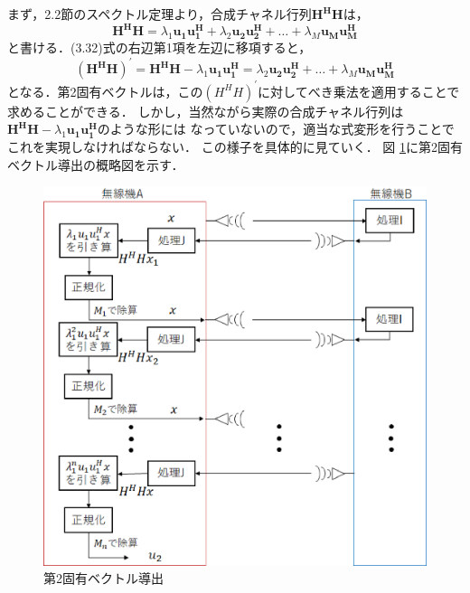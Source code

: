 まず，2.2節のスペクトル定理より，合成チャネル行列$\bm{H^HH}$は，
\begin{equation}
    \bm{H^HH} = \lambda_1\bm{u_1u_1^H}+\lambda_2\bm{u_2u_2^H}+\ldots+\lambda_M\bm{u_Mu_M^H}
\end{equation}
と書ける．(3.32)式の右辺第1項を左辺に移項すると，
\begin{equation}
    (\bm{H^HH})^{\prime}=\bm{H^HH}-\lambda_1\bm{u_1u_1^H}=\lambda_2\bm{u_2u_2^H}+\ldots+\lambda_M\bm{u_Mu_M^H}
\end{equation}
となる．第2固有ベクトルは，この$(H^HH)^{\prime}$に対してべき乗法を適用することで求めることができる．
しかし，当然ながら実際の合成チャネル行列は$\bm{H^HH}-\lambda_1\bm{u_1u_1^H}$のような形には
なっていないので，適当な式変形を行うことでこれを実現しなければならない．
この様子を具体的に見ていく．
図 \ref{figProcIJ2}に第2固有ベクトル導出の概略図を示す．
\begin{figure}
    \centering
    \includegraphics[width=0.7\linewidth]{chapter3/figure/ProcIJ2.eps}
    \caption{第2固有ベクトル導出}
    \label{figProcIJ2}
\end{figure}

